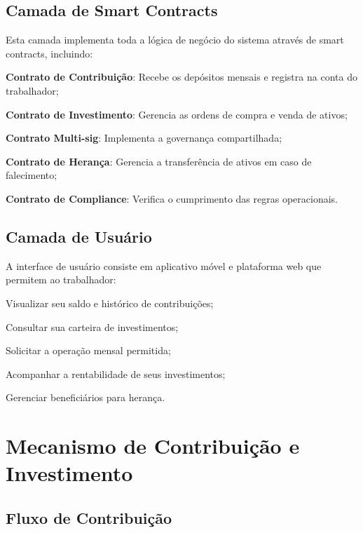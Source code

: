 \subsection{Camada de Smart Contracts}

Esta camada implementa toda a lógica de negócio do sistema através de smart contracts, incluindo:

\begin{alineas}
    \item \textbf{Contrato de Contribuição}: Recebe os depósitos mensais e registra na conta do trabalhador;
    \item \textbf{Contrato de Investimento}: Gerencia as ordens de compra e venda de ativos;
    \item \textbf{Contrato Multi-sig}: Implementa a governança compartilhada;
    \item \textbf{Contrato de Herança}: Gerencia a transferência de ativos em caso de falecimento;
    \item \textbf{Contrato de Compliance}: Verifica o cumprimento das regras operacionais.
\end{alineas}

\subsection{Camada de Usuário}

A interface de usuário consiste em aplicativo móvel e plataforma web que permitem ao trabalhador:

\begin{alineas}
    \item Visualizar seu saldo e histórico de contribuições;
    \item Consultar sua carteira de investimentos;
    \item Solicitar a operação mensal permitida;
    \item Acompanhar a rentabilidade de seus investimentos;
    \item Gerenciar beneficiários para herança.
\end{alineas}

\section{Mecanismo de Contribuição e Investimento}

\subsection{Fluxo de Contribuição}

